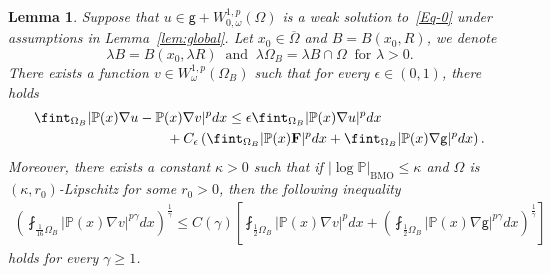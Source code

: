\documentclass[a4paper, 11pt]{article}
\newtheorem{lemma}[theorem]{Lemma}
\begin{document}
\begin{lemma}\label{lem:comp}
Suppose that $u \in \mathsf{g} + W^{1,p}_{0,\omega}(\Omega)$ is a weak solution to~\eqref{Eq-0} under assumptions in Lemma~\ref{lem:global}. Let $x_0 \in \overline{\Omega}$ and $B = B(x_0,R)$, we denote 
$$\lambda B = B(x_0,\lambda R) \ \mbox{ and } \ \lambda\Omega_{B} = \lambda B \cap \Omega \ \mbox{ for } \lambda>0.$$
There exists a function $v \in W^{1,p}_{\omega}(\Omega_B)$ such that for every $\epsilon \in (0,1)$, there holds
\begin{align}\label{est-lem:comp}
\fint_{\Omega_B} |\mathbb{P}(x)\nabla u & - \mathbb{P}(x)\nabla v|^p  dx  \le \epsilon \fint_{\Omega_B} |\mathbb{P}(x)\nabla u|^{p}dx \notag \\
& \qquad   + C_{\epsilon} \left(\fint_{\Omega_B} |\mathbb{P}(x)\mathbf{F}|^{p}dx + \fint_{\Omega_B} |\mathbb{P}(x)\nabla \mathsf{g}|^{p}dx\right).
\end{align}
Moreover, there exists a constant $\kappa>0$ such that if $|\log \mathbb{P}|_{\mathrm{BMO}} \le \kappa$ and $\Omega$ is $(\kappa,r_0)$-Lipschitz for some $r_0>0$, then the following inequality
\begin{align}\label{est-lem:Re}
\left(\fint_{\frac{1}{16} \Omega_B} |\mathbb{P}(x)\nabla v|^{p\gamma}dx  \right)^{\frac{1}{\gamma}} \le C(\gamma) \left[ \fint_{\frac{1}{2} \Omega_B} |\mathbb{P}(x)\nabla v|^{p} dx + \left(\fint_{\frac{1}{2} \Omega_B} |\mathbb{P}(x)\nabla \mathsf{g}|^{p\gamma}dx \right)^{\frac{1}{\gamma}}\right]
\end{align}
holds for every $\gamma \ge 1$. 
\end{lemma}
\end{document}
